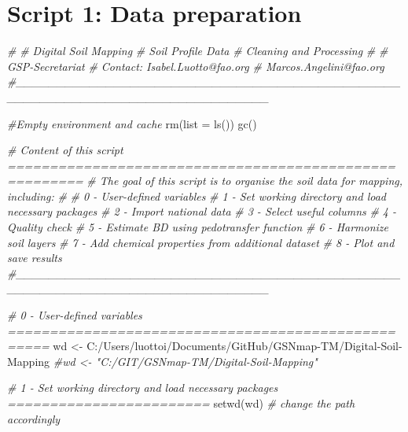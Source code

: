 \documentclass[
  10pt,
  b5paper,
  oneside]{book}
\newenvironment{Shaded}{\begin{snugshade}}{\end{snugshade}}
\newcommand{\AttributeTok}[1]{\textcolor[rgb]{0.77,0.63,0.00}{#1}}
\newcommand{\CommentTok}[1]{\textcolor[rgb]{0.56,0.35,0.01}{\textit{#1}}}
\newcommand{\FunctionTok}[1]{\textcolor[rgb]{0.00,0.00,0.00}{#1}}
\newcommand{\NormalTok}[1]{#1}
\newcommand{\OtherTok}[1]{\textcolor[rgb]{0.56,0.35,0.01}{#1}}
\newcommand{\StringTok}[1]{\textcolor[rgb]{0.31,0.60,0.02}{#1}}
\begin{document}
\hypertarget{script-1-data-preparation}{%
\section*{Script 1: Data preparation}\label{script-1-data-preparation}}

\begin{Shaded}
\begin{Highlighting}[]
\CommentTok{\#}
\CommentTok{\# Digital Soil Mapping}
\CommentTok{\# Soil Profile Data}
\CommentTok{\# Cleaning and Processing}
\CommentTok{\#}
\CommentTok{\# GSP{-}Secretariat}
\CommentTok{\# Contact: Isabel.Luotto@fao.org}
\CommentTok{\#          Marcos.Angelini@fao.org}
\CommentTok{\#\_\_\_\_\_\_\_\_\_\_\_\_\_\_\_\_\_\_\_\_\_\_\_\_\_\_\_\_\_\_\_\_\_\_\_\_\_\_\_\_\_\_\_\_\_\_\_\_\_\_\_\_\_\_\_\_\_\_\_\_\_\_\_\_\_\_\_\_\_\_\_\_\_\_\_\_\_\_\_}

\CommentTok{\#Empty environment and cache }
\FunctionTok{rm}\NormalTok{(}\AttributeTok{list =} \FunctionTok{ls}\NormalTok{())}
\FunctionTok{gc}\NormalTok{()}

\CommentTok{\# Content of this script =======================================================}
\CommentTok{\# The goal of this script is to organise the soil data for mapping, including:}
\CommentTok{\# }
\CommentTok{\# 0 {-} User{-}defined variables }
\CommentTok{\# 1 {-} Set working directory and load necessary packages}
\CommentTok{\# 2 {-} Import national data }
\CommentTok{\# 3 {-} Select useful columns}
\CommentTok{\# 4 {-} Quality check}
\CommentTok{\# 5 {-} Estimate BD using pedotransfer function}
\CommentTok{\# 6 {-} Harmonize soil layers}
\CommentTok{\# 7 {-} Add chemical properties from additional dataset}
\CommentTok{\# 8 {-} Plot and save results}
\CommentTok{\#\_\_\_\_\_\_\_\_\_\_\_\_\_\_\_\_\_\_\_\_\_\_\_\_\_\_\_\_\_\_\_\_\_\_\_\_\_\_\_\_\_\_\_\_\_\_\_\_\_\_\_\_\_\_\_\_\_\_\_\_\_\_\_\_\_\_\_\_\_\_\_\_\_\_\_\_\_\_\_}

\CommentTok{\# 0 {-} User{-}defined variables ===================================================}
\NormalTok{wd }\OtherTok{\textless{}{-}} \StringTok{\textquotesingle{}C:/Users/luottoi/Documents/GitHub/GSNmap{-}TM/Digital{-}Soil{-}Mapping\textquotesingle{}}
\CommentTok{\#wd \textless{}{-} "C:/GIT/GSNmap{-}TM/Digital{-}Soil{-}Mapping"}

\CommentTok{\# 1 {-} Set working directory and load necessary packages ========================}
\FunctionTok{setwd}\NormalTok{(wd) }\CommentTok{\# change the path accordingly}


\end{Highlighting}
\end{Shaded}
\end{document}

